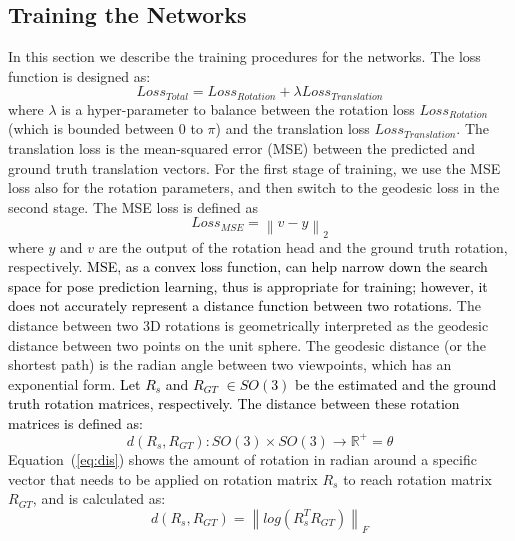 \documentclass[journal,transmag]{IEEEtran}
\begin{document}
\subsection{Training the Networks}
In this section we describe the training procedures for the networks. The loss function is designed as:
\begin{equation}
    Loss_{Total} = Loss_{Rotation} + \lambda Loss_{Translation}
    \label{eq:total}
\end{equation}
\noindent where $\lambda$ is a hyper-parameter to balance between the rotation loss $Loss_{Rotation}$ (which is bounded between 0 to $\pi$) and the translation loss $Loss_{Translation}$. The translation loss is the mean-squared error (MSE) between the predicted and ground truth translation vectors. For the first stage of training, we use the MSE loss also for the rotation parameters, and then switch to the geodesic loss in the second stage. The MSE loss is defined as
\begin{equation}
    Loss_{MSE} = \left \| v-y \right \|_2
    \label{eq:MSE}
\end{equation}
where $y$ and $v$ are the output of the rotation head and the ground truth rotation, respectively. %
\textcolor{black}{MSE, as a convex loss function, can help narrow down the search space for pose prediction learning, thus is appropriate for training; however, it does not accurately represent a distance function between two rotations.} The distance between two 3D rotations is geometrically interpreted as the geodesic distance between two points on the unit sphere. The geodesic distance (or the shortest path) is the radian angle between two viewpoints, which has an exponential form. %
\textcolor{black}{Let $R_{s}$ and $R_{GT}$ $\in SO(3)$ be the estimated and the ground truth rotation matrices, respectively. The distance between these rotation matrices is defined as:}
\begin{equation}
    d(R_s, R_{GT}):SO(3)\times SO(3) \rightarrow \mathbb{R}^{+} = \theta
    \label{eq:dis}
\end{equation}
Equation~(\ref{eq:dis}) shows the amount of rotation in radian around a specific vector that needs to be applied on rotation matrix $R_s$ to reach rotation matrix $R_{GT}$, and is calculated as:
\begin{equation}
    d(R_s, R_{GT}) = \left \| log(R_s^TR_{GT}) \right \|_F
    \label{eq:dis2}
\end{equation}
\end{document}
